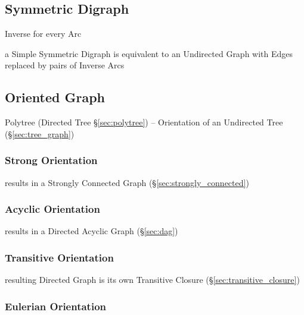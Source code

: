 \subsection{Symmetric Digraph}\label{sec:symmetric_digraph}

Inverse for every Arc

a Simple Symmetric Digraph is equivalent to an Undirected Graph with
Edges replaced by pairs of Inverse Arcs



\subsection{Oriented Graph}\label{sec:oriented_graph}

\fist Polytree (Directed Tree \S\ref{sec:polytree}) -- Orientation of an
Undirected Tree (\S\ref{sec:tree_graph})



\subsubsection{Strong Orientation}\label{sec:strong_orientation}

results in a Strongly Connected Graph (\S\ref{sec:strongly_connected})



\subsubsection{Acyclic Orientation}\label{sec:acyclic_orientation}

results in a Directed Acyclic Graph (\S\ref{sec:dag})



\subsubsection{Transitive Orientation}\label{sec:transitive_orientation}

resulting Directed Graph is its own Transitive Closure
(\S\ref{sec:transitive_closure})



\subsubsection{Eulerian Orientation}\label{sec:eulerian_orientation}

